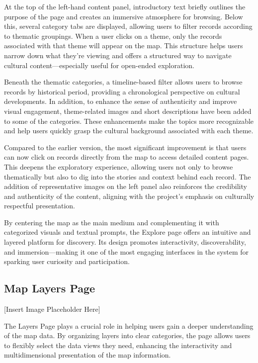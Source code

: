 At the top of the left-hand content panel, introductory text briefly outlines the purpose of the page and creates an immersive atmosphere for browsing. Below this, several category tabs are displayed, allowing users to filter records according to thematic groupings. When a user clicks on a theme, only the records associated with that theme will appear on the map. This structure helps users narrow down what they're viewing and offers a structured way to navigate cultural content—especially useful for open-ended exploration.

Beneath the thematic categories, a timeline-based filter allows users to browse records by historical period, providing a chronological perspective on cultural developments. In addition, to enhance the sense of authenticity and improve visual engagement, theme-related images and short descriptions have been added to some of the categories. These enhancements make the topics more recognizable and help users quickly grasp the cultural background associated with each theme.

Compared to the earlier version, the most significant improvement is that users can now click on records directly from the map to access detailed content pages. This deepens the exploratory experience, allowing users not only to browse thematically but also to dig into the stories and context behind each record. The addition of representative images on the left panel also reinforces the credibility and authenticity of the content, aligning with the project's emphasis on culturally respectful presentation.

By centering the map as the main medium and complementing it with categorized visuals and textual prompts, the Explore page offers an intuitive and layered platform for discovery. Its design promotes interactivity, discoverability, and immersion—making it one of the most engaging interfaces in the system for sparking user curiosity and participation.

\subsection{Map Layers Page}
[Insert Image Placeholder Here]

The Layers Page plays a crucial role in helping users gain a deeper understanding of the map data. By organizing layers into clear categories, the page allows users to flexibly select the data views they need, enhancing the interactivity and multidimensional presentation of the map information.

